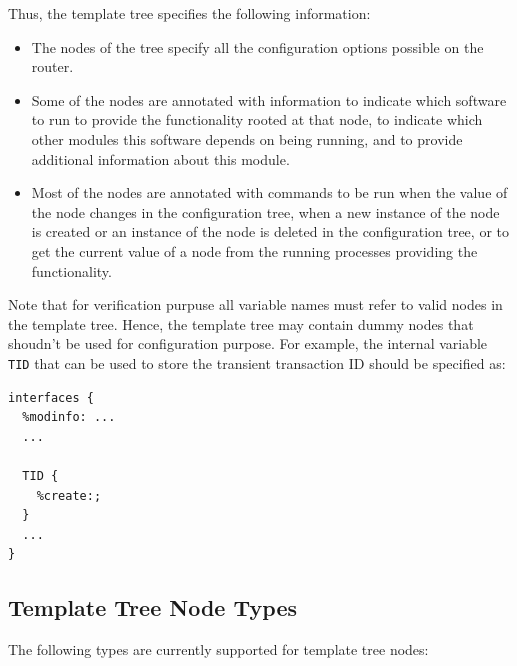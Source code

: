 \documentclass[11pt]{article}
\begin{document}
Thus, the template tree specifies the following information:

\begin{itemize}

  \item The nodes of the tree specify all the configuration options
possible on the router.

  \item Some of the nodes are annotated with information to indicate
which software to run to provide the functionality rooted at that
node, to indicate which other modules this software depends on
being running, and to provide additional information about this module.
\item Most of the nodes are annotated with commands to be run when the
value of the node changes in the configuration tree, when a new
instance of the node is created or an instance of the node is deleted
in the configuration tree, or to get the current value of a node from
the running processes providing the functionality.

\end{itemize}

Note that for verification purpuse all variable names must refer to valid
nodes in the template tree. Hence, the template tree may contain dummy nodes
that shoudn't be used for configuration purpose. For example, the internal
variable {\tt TID} that can be used to store the transient transaction ID
should be specified as:

\begin{verbatim}
interfaces {
  %modinfo: ...
  ...

  TID {
    %create:;
  }
  ...
}

\end{verbatim}

\newpage

\subsection{Template Tree Node Types}

The following types are currently supported for template tree nodes:
\end{document}
